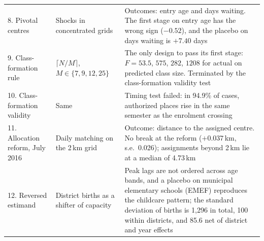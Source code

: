 {\begin{longtable}{p{3.3cm}p{4.2cm}p{7.1cm}}
8. Pivotal centres & Shocks in concentrated grids & Outcomes: entry age and days waiting. The first stage on entry age has the wrong sign ($-0.52$), and the placebo on days waiting is $+7.40$ days \\
9. Class-formation rule & $\lceil N/M \rceil$, $M \in \{7,9,12,25\}$ & The only design to pass its first stage: $F = 53.5$, $575$, $282$, $1208$ for actual on predicted class size. Terminated by the class-formation validity test \\
10. Class-formation validity & Same & Timing test failed: in 94.9\% of cases, authorized places rise in the same semester as the enrolment crossing \\
11. Allocation reform, July 2016 & Daily matching on the 2\,km grid & Outcome: distance to the assigned centre. No break at the reform ($+0.037$\,km, s.e.\ 0.026); assignments beyond 2\,km lie at a median of 4.73\,km \\
12. Reversed estimand & District births as a shifter of capacity & Peak lags are not ordered across age bands, and a placebo on municipal elementary schools (EMEF) reproduces the childcare pattern; the standard deviation of births is 1,296 in total, 100 within districts, and 85.6 net of district and year effects \\
\end{longtable}
}
